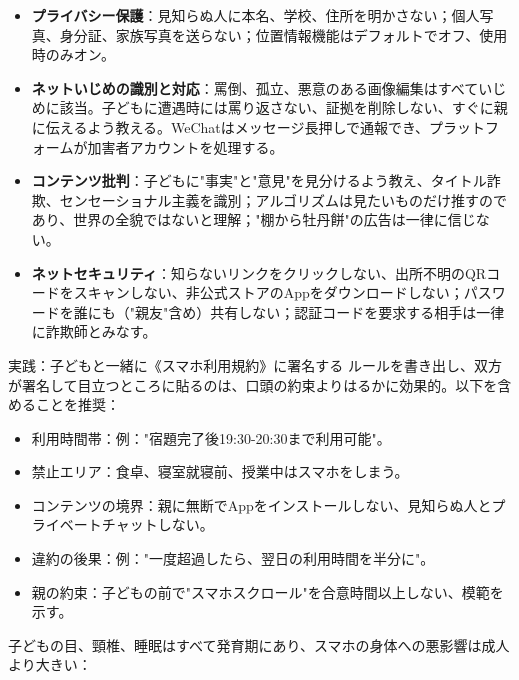 \begin{itemize}
  \item \textbf{プライバシー保護}：見知らぬ人に本名、学校、住所を明かさない；個人写真、身分証、家族写真を送らない；位置情報機能はデフォルトでオフ、使用時のみオン。
  \item \textbf{ネットいじめの識別と対応}：罵倒、孤立、悪意のある画像編集はすべていじめに該当。子どもに遭遇時には罵り返さない、証拠を削除しない、すぐに親に伝えるよう教える。WeChatはメッセージ長押しで通報でき、プラットフォームが加害者アカウントを処理する。
  \item \textbf{コンテンツ批判}：子どもに"事実"と"意見"を見分けるよう教え、タイトル詐欺、センセーショナル主義を識別；アルゴリズムは見たいものだけ推すのであり、世界の全貌ではないと理解；"棚から牡丹餅"の広告は一律に信じない。
  \item \textbf{ネットセキュリティ}：知らないリンクをクリックしない、出所不明のQRコードをスキャンしない、非公式ストアのAppをダウンロードしない；パスワードを誰にも（"親友"含め）共有しない；認証コードを要求する相手は一律に詐欺師とみなす。
\end{itemize}

\begin{tcbpractice}{実践：子どもと一緒に《スマホ利用規約》に署名する}
ルールを書き出し、双方が署名して目立つところに貼るのは、口頭の約束よりはるかに効果的。以下を含めることを推奨：

\begin{itemize}
  \item 利用時間帯：例："宿題完了後19:30-20:30まで利用可能"。
  \item 禁止エリア：食卓、寝室就寝前、授業中はスマホをしまう。
  \item コンテンツの境界：親に無断でAppをインストールしない、見知らぬ人とプライベートチャットしない。
  \item 違約の後果：例："一度超過したら、翌日の利用時間を半分に"。
  \item 親の約束：子どもの前で"スマホスクロール"を合意時間以上しない、模範を示す。
\end{itemize}

\end{tcbpractice}


子どもの目、頸椎、睡眠はすべて発育期にあり、スマホの身体への悪影響は成人より大きい：

